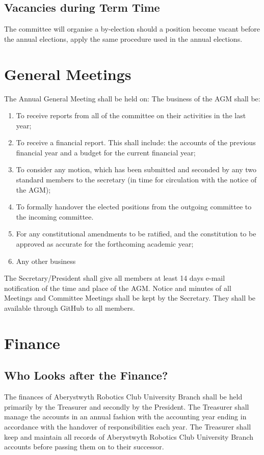 \documentclass[a4paper,11pt]{article}
\begin{document}
\subsection{Vacancies during Term Time}
The committee will organise a by-election should a position become vacant before the annual elections, apply the same procedure used in the annual elections.

\section{General Meetings}
The Annual General Meeting shall be held on:\newline
The business of the AGM shall be:
\begin{enumerate}[nolistsep]
  \item To receive reports from all of the committee on their activities in the last year;
  \item To receive a financial report. This shall include: the accounts of the previous financial year and a budget for the current financial year;
  \item To consider any motion, which has been submitted and seconded by any two standard members to the secretary (in time for circulation with the notice of the AGM);
  \item To formally handover the elected positions from the outgoing committee to the incoming committee.
  \item For any constitutional amendments to be ratified, and the constitution to be approved as accurate for the forthcoming academic year;
  \item Any other business
\end{enumerate}
The Secretary/President shall give all members at least 14 days e-mail notification of the time and place of the AGM.\newline
Notice and minutes of all Meetings and Committee Meetings shall be kept by the Secretary.\newline
They shall be available through GitHub to all members.

\section{Finance}
\subsection{Who Looks after the Finance?}
The finances of Aberystwyth Robotics Club University Branch shall be held primarily by the Treasurer and secondly by the President.\newline
The Treasurer shall manage the accounts in an annual fashion with the accounting year ending in accordance with the handover of responsibilities each year.\newline
The Treasurer shall keep and maintain all records of Aberystwyth Robotics Club University Branch accounts before passing them on to their successor.
\end{document}
